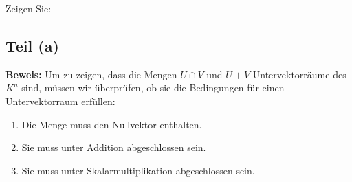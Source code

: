 \documentclass[11pt]{article}
\begin{document}
Zeigen Sie:

\subsection*{Teil (a)}

\textbf{Beweis:} Um zu zeigen, dass die Mengen \( U \cap V \) und \( U + V \) Untervektorräume des \( K^n \) sind, müssen wir überprüfen, ob sie die Bedingungen für einen Untervektorraum erfüllen:

\begin{enumerate}
    \item Die Menge muss den Nullvektor enthalten.
    \item Sie muss unter Addition abgeschlossen sein.
    \item Sie muss unter Skalarmultiplikation abgeschlossen sein.
\end{enumerate}
\end{document}
